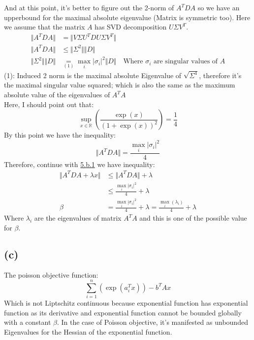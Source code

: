 \documentclass[]{article}
\begin{document}
    And at this point, it's better to figure out the 2-norm of $A^TDA$ so we have an upperbound for the maximal absolute eigenvalue (Matrix is symmetric too). Here we assume that the matrix $A$ has SVD decomposition $U\Sigma V^T$. 
        \begin{align*}\tag{5.b.2}\label{eqn:5.b.2}
            \Vert A^TDA\Vert &= \Vert V \Sigma U^T D U \Sigma V^T  \Vert
            \\
            \Vert A^TDA\Vert &\le \Vert \Sigma^2\Vert \Vert D\Vert
            \\
            \Vert \Sigma^2\Vert \Vert D\Vert &\underset{(1)}{=} \max_{i} |\sigma_i|^2\Vert D\Vert \quad \text{Where $\sigma_i$ are singular values of $A$}
        \end{align*}
    (1): Induced 2 norm is the maximal absolute Eigenvalue of $\sqrt{\Sigma^4}$, therefore it's the maximal singular value squared; which is also the same as the maximum absolute value of the eigenvalues of $A^TA$ 
    \\
    Here, I should point out that: 
        $$
            \sup_{x\in \mathbb{R}} \left(
                \frac{\exp(x)}{(1 + \exp(x))^2}
            \right) = \frac{1}{4}
        $$
    By this point we have the inequality:
        \begin{equation*}\tag{5.b.3}\label{eqn:5.b.3}
            \Vert A^T DA\Vert = \frac{\max_{i} |\sigma_i|^2}{4}
        \end{equation*}
    Therefore, continue with \hyperref[eqn:5.b.1]{5.b.1} we have inequality: 
        \begin{align*}\tag{5.b.4}\label{eqn:5.b.4}
            \Vert A^TDA + \lambda x\Vert
            &\le \Vert A^TDA\Vert + \lambda
            \\
            &\le \frac{\max_{i} |\sigma_i|^2}{4} + \lambda
            \\
            \beta &= \frac{\max_{i} |\sigma_i|^2}{4} + \lambda
        = \frac{\max_i(\lambda_i)}{4} + \lambda
        \end{align*}
    Where $\lambda_i$ are the eigenvalues of matrix $A^TA$ and this is one of the possible value for $\beta$. 
    \subsection*{(c)}
    The poisson objective function: 
    $$
        \sum_{i = 1}^{n} \left(\exp(a_i^Tx) \right) - b^TAx
    $$
    Which is not Liptschitz continuous because exponential function has exponential function as its derivative and exponential function cannot be bounded globally with a constant $\beta$. In the case of Poisson objective, it's manifested as unbounded Eigenvalues for the Hessian of the exponential function. 
\end{document}
